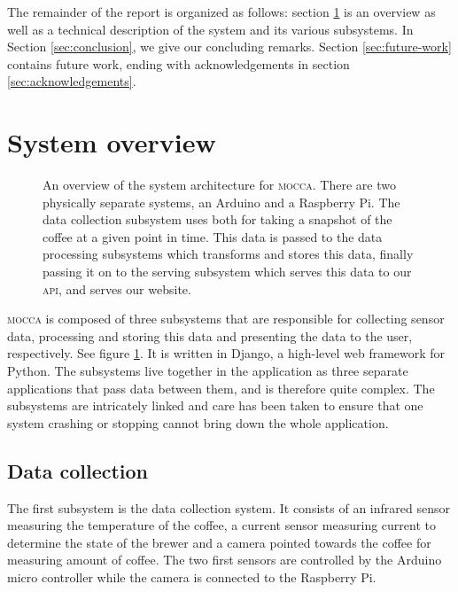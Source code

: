 \documentclass[12pt,a4paper,oneside,article]{memoir}
\numberwithin{equation}{chapter}
\begin{document}
The remainder of the report is organized as follows: section
\ref{sec:system-overview} is an overview as well as a technical description of
the system and its various subsystems. In Section \ref{sec:conclusion}, we give
our concluding remarks. Section \ref{sec:future-work} contains future work,
ending with acknowledgements in section \ref{sec:acknowledgements}.

\section{System overview}\label{sec:system-overview}
\begin{figure}[h]
  \centerfloat{}
  \scalebox{.75}{}
  \caption{An overview of the system architecture for \textsc{mocca}. There are
    two physically separate systems, an Arduino and a Raspberry Pi. The data
    collection subsystem uses both for taking a snapshot of the coffee at a
    given point in time. This data is passed to the data processing subsystems
    which transforms and stores this data, finally passing it on to the serving
    subsystem which serves this data to our \textsc{api}, and serves our website.
  }\label{fig:architecture}
\end{figure}
\textsc{mocca} is composed of three subsystems that are responsible for
collecting sensor data, processing and storing this data and presenting the data
to the user, respectively. See figure \ref{fig:architecture}. It is written in
Django, a high-level web framework for Python. The subsystems live together in
the application as three separate applications that pass data between them, and
is therefore quite complex. The subsystems are intricately linked and care has
been taken to ensure that one system crashing or stopping cannot bring down the
whole application.

\subsection{Data collection}\label{sec:data-collection}
The first subsystem is the data collection system. It consists of an 
infrared sensor measuring the temperature of the coffee, a current sensor 
measuring current to determine the state of the brewer and a camera pointed 
towards the coffee for measuring amount of coffee. The two first sensors are 
controlled by the Arduino micro controller while the camera is connected to the 
Raspberry Pi.
\end{document}
